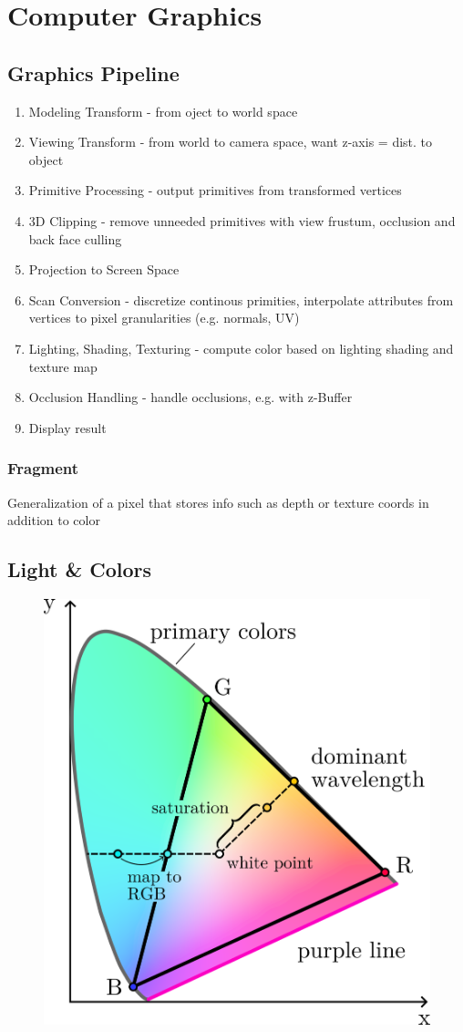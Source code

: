 \documentclass[a4paper,10pt]{article}
\begin{document}
\section{Computer Graphics}
\subsection{Graphics Pipeline}
\begin{enumerate}
    \item Modeling Transform - from oject to world space
    \item Viewing Transform - from world to camera space, want z-axis = dist. to object
    \item Primitive Processing - output primitives from transformed vertices
    \item 3D Clipping - remove unneeded primitives with view frustum, occlusion and back face culling
    \item Projection to Screen Space
    \item Scan Conversion - discretize continous primities, interpolate attributes from vertices to pixel granularities (e.g. normals, UV)
    \item Lighting, Shading, Texturing - compute color based on lighting shading and texture map
    \item Occlusion Handling - handle occlusions, e.g. with z-Buffer
    \item Display result
\end{enumerate}

\subsubsection{Fragment} Generalization of a pixel that stores info such as depth or texture coords in addition to color

\subsection{Light \& Colors}

\begin{figure}[h]
    \centering
    \includegraphics[width=0.6\linewidth]{ciergb.png}
\end{figure}
\end{document}
